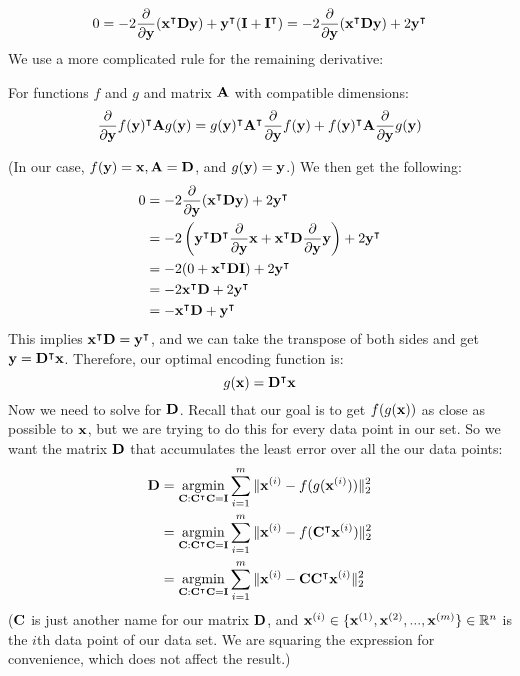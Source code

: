 $$0 = -2\frac{\partial}{\partial\vy}(\vx^\intercal\MD\vy) + \vy^\intercal(\MI + \MI^\intercal) = -2\frac{\partial}{\partial\vy}(\vx^\intercal\MD\vy) + 2\vy^\intercal$$
We use a more complicated rule for the remaining derivative:
\begin{theorem}
    For functions $f$ and $g$ and matrix $\MA$ with compatible dimensions:
    $$\frac{\partial}{\partial\vy}f(\vy)^\intercal\MA g(\vy) = g(\vy)^\intercal\MA^\intercal\frac{\partial}{\partial\vy}f(\vy) + f(\vy)^\intercal\MA\frac{\partial}{\partial\vy}g(\vy)$$
\end{theorem}
(In our case, $f(\vy) = \vx, \MA = \MD$, and $g(\vy) = \vy$.)
We then get the following:
\begin{align*}
0 &= -2\frac{\partial}{\partial\vy}(\vx^\intercal\MD\vy) + 2\vy^\intercal \\
&= -2\left(\vy^\intercal\MD^\intercal\frac{\partial}{\partial\vy}\vx + \vx^\intercal\MD\frac{\partial}{\partial\vy}\vy\right) + 2\vy^\intercal\\
&= -2(0 + \vx^\intercal\MD\MI) + 2\vy^\intercal\\
&= -2\vx^\intercal\MD + 2\vy^\intercal\\
&= -\vx^\intercal\MD + \vy^\intercal
\end{align*}
This implies $\vx^\intercal\MD = \vy^\intercal$, and we can take the transpose of both sides and get $\vy = \MD^\intercal\vx$.  Therefore, our optimal encoding function is:
$$g(\vx) = \MD^\intercal\vx$$
Now we need to solve for $\MD$.
Recall that our goal is to get $f(g(\vx))$ as close as possible to $\vx$, but we are trying to do this for every data point in our set.  So we want the matrix $\MD$ that accumulates the least error over all the our data points:
\begin{align*}
    \MD &= \underset{\MC : \MC^\intercal\MC = \MI}{\argmin} \sum^m_{i=1} \|\vx^{(i)} - f(g(\vx^{(i)}))\|^2_2\\
&= \underset{\MC : \MC^\intercal\MC = \MI}{\argmin} \sum^m_{i=1} \|\vx^{(i)} - f(\MC^\intercal\vx^{(i)})\|^2_2\\
&= \underset{\MC : \MC^\intercal\MC = \MI}{\argmin} \sum^m_{i=1} \|\vx^{(i)} - \MC\MC^\intercal\vx^{(i)}\|^2_2\\
\end{align*}
($\MC$ is just another name for our matrix $\MD$, and $\vx^{(i)} \in \{\vx^{(1)}, \vx^{(2)}, ..., \vx^{(m)} \} \in \R^n$ is the $i$th data point of our data set.  We are squaring the expression for convenience, which does not affect the result.)

